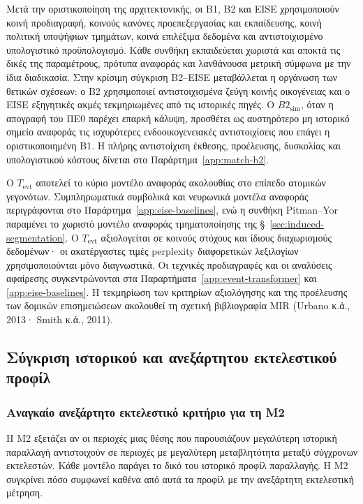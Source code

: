 \documentclass[11pt,a4paper]{article}
\begin{document}
Μετά την οριστικοποίηση της αρχιτεκτονικής, οι B1, B2 και EISE χρησιμοποιούν κοινή προδιαγραφή, κοινούς κανόνες προεπεξεργασίας και εκπαίδευσης, κοινή πολιτική υποψήφιων τμημάτων, κοινά επιλέξιμα δεδομένα και αντιστοιχισμένο υπολογιστικό προϋπολογισμό. Κάθε συνθήκη εκπαιδεύεται χωριστά και αποκτά τις δικές της παραμέτρους, πρότυπα αναφοράς και λανθάνουσα μετρική σύμφωνα με την ίδια διαδικασία. Στην κρίσιμη σύγκριση B2--EISE μεταβάλλεται η οργάνωση των θετικών σχέσεων: ο B2 χρησιμοποιεί αντιστοιχισμένα ζεύγη κοινής οικογένειας και ο EISE εξηγητικές ακμές τεκμηριωμένες από τις ιστορικές πηγές. Ο $B2_{\mathrm{sim}}$, όταν η απογραφή του ΠΕ0 παρέχει επαρκή κάλυψη, προσθέτει ως αυστηρότερο μη ιστορικό σημείο αναφοράς τις ισχυρότερες ενδοοικογενειακές αντιστοιχίσεις που επάγει η οριστικοποιημένη B1. Η πλήρης αντιστοίχιση έκθεσης, προέλευσης, δυσκολίας και υπολογιστικού κόστους δίνεται στο Παράρτημα~\ref{app:match-b2}.

Ο $T_{\mathrm{evt}}$ αποτελεί το κύριο μοντέλο αναφοράς ακολουθίας στο επίπεδο ατομικών γεγονότων. Συμπληρωματικά συμβολικά και νευρωνικά μοντέλα αναφοράς περιγράφονται στο Παράρτημα~\ref{app:eise-baselines}, ενώ η συνθήκη Pitman--Yor παραμένει το χωριστό μοντέλο αναφοράς τμηματοποίησης της §~\ref{sec:induced-segmentation}. Ο $T_{\mathrm{evt}}$ αξιολογείται σε κοινούς στόχους και ίδιους διαχωρισμούς δεδομένων· οι ακατέργαστες τιμές perplexity διαφορετικών λεξιλογίων χρησιμοποιούνται μόνο διαγνωστικά. Οι τεχνικές προδιαγραφές και οι αναλύσεις αφαίρεσης συγκεντρώνονται στα Παραρτήματα~\ref{app:event-transformer} και \ref{app:eise-baselines}. Η τεκμηρίωση των κριτηρίων αξιολόγησης και της προέλευσης των δομικών επισημειώσεων ακολουθεί τη σχετική βιβλιογραφία MIR (Urbano κ.ά., 2013· Smith κ.ά., 2011).

\subsection{Σύγκριση ιστορικού και ανεξάρτητου εκτελεστικού προφίλ}\label{sec:eise-transfer}

\subsubsection{Αναγκαίο ανεξάρτητο εκτελεστικό κριτήριο για τη M2}\label{sec:m4-min}

Η M2 εξετάζει αν οι περιοχές μιας θέσης που παρουσιάζουν μεγαλύτερη ιστορική παραλλαγή αντιστοιχούν σε περιοχές με μεγαλύτερη μεταβλητότητα μεταξύ σύγχρονων εκτελεστών. Κάθε μοντέλο παράγει το δικό του ιστορικό προφίλ παραλλαγής. Η M2 συγκρίνει πόσο συμφωνεί καθένα από αυτά τα προφίλ με την ανεξάρτητη εκτελεστική μέτρηση.
\end{document}
